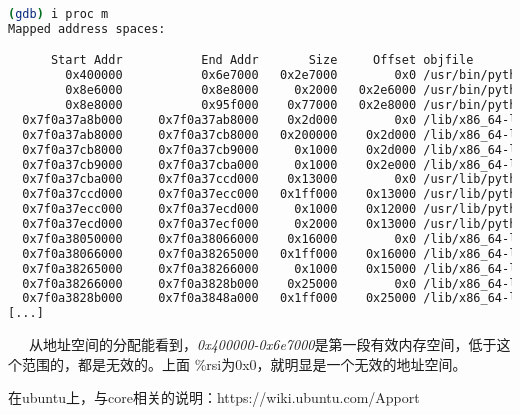 \documentclass[12pt]{article}  %
\begin{document}
\begin{lstlisting}[language=sh]
(gdb) i proc m
Mapped address spaces:

      Start Addr           End Addr       Size     Offset objfile
        0x400000           0x6e7000   0x2e7000        0x0 /usr/bin/python2.7
        0x8e6000           0x8e8000     0x2000   0x2e6000 /usr/bin/python2.7
        0x8e8000           0x95f000    0x77000   0x2e8000 /usr/bin/python2.7
  0x7f0a37a8b000     0x7f0a37ab8000    0x2d000        0x0 /lib/x86_64-linux-gnu/libncursesw.so.5.9
  0x7f0a37ab8000     0x7f0a37cb8000   0x200000    0x2d000 /lib/x86_64-linux-gnu/libncursesw.so.5.9
  0x7f0a37cb8000     0x7f0a37cb9000     0x1000    0x2d000 /lib/x86_64-linux-gnu/libncursesw.so.5.9
  0x7f0a37cb9000     0x7f0a37cba000     0x1000    0x2e000 /lib/x86_64-linux-gnu/libncursesw.so.5.9
  0x7f0a37cba000     0x7f0a37ccd000    0x13000        0x0 /usr/lib/python2.7/lib-dynload/_curses.x86_64-linux-gnu.so
  0x7f0a37ccd000     0x7f0a37ecc000   0x1ff000    0x13000 /usr/lib/python2.7/lib-dynload/_curses.x86_64-linux-gnu.so
  0x7f0a37ecc000     0x7f0a37ecd000     0x1000    0x12000 /usr/lib/python2.7/lib-dynload/_curses.x86_64-linux-gnu.so
  0x7f0a37ecd000     0x7f0a37ecf000     0x2000    0x13000 /usr/lib/python2.7/lib-dynload/_curses.x86_64-linux-gnu.so
  0x7f0a38050000     0x7f0a38066000    0x16000        0x0 /lib/x86_64-linux-gnu/libgcc_s.so.1
  0x7f0a38066000     0x7f0a38265000   0x1ff000    0x16000 /lib/x86_64-linux-gnu/libgcc_s.so.1
  0x7f0a38265000     0x7f0a38266000     0x1000    0x15000 /lib/x86_64-linux-gnu/libgcc_s.so.1
  0x7f0a38266000     0x7f0a3828b000    0x25000        0x0 /lib/x86_64-linux-gnu/libtinfo.so.5.9
  0x7f0a3828b000     0x7f0a3848a000   0x1ff000    0x25000 /lib/x86_64-linux-gnu/libtinfo.so.5.9
[...]
\end{lstlisting}
\ \ \  从地址空间的分配能看到，\emph{0x400000-0x6e7000}是第一段有效内存空间，低于这个范围的，都是无效的。上面 \%rsi为0x0，就明显是一个无效的地址空间。

在ubuntu上，与core相关的说明：https://wiki.ubuntu.com/Apport
\end{document}
